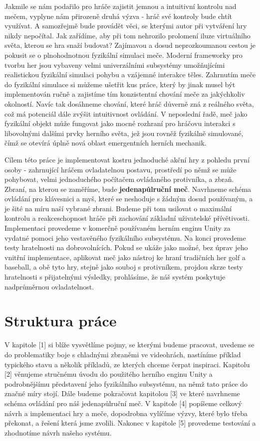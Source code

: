 Jakmile se nám podařilo pro hráče zajistit jemnou a intuitivní kontrolu nad mečem, vyplyne nám přirozeně druhá výzva - hráč své kontroly bude chtít využívat. A samozřejmě bude provádět věci, se kterými autor při vytváření hry nikdy nepočítal. Jak zařídíme, aby při tom nehrozilo prolomení iluze virtuálního světa, kterou se hra snaží budovat? Zajímavou a dosud neprozkoumanou cestou je pokusit se o plnohodnotnou fyzikální simulaci meče. Moderní frameworky pro tvorbu her jsou vybaveny velmi univerzálními subsystémy umožňujícími realistickou fyzikální simulaci pohybu a vzájemné interakce těles. Zahrnutím meče do fyzikální simulace si můžeme ušetřit kus práce, který by jinak musel být implementován ručně a zajistíme tím konzistentní chování meče za jakýchkoliv okolností. Navíc tak dosáhneme chování, které hráč důverně zná z reálného světa, což má potenciál dále zvýšit intuitivnost ovládání. V neposlední řadě, meč jako fyzikální objekt může fungovat jako mocné rozhraní pro hráčovu interakci s libovolnými dalšími prvky herního světa, jež jsou rovněž fyzikálně simulované, čímž se otevírá úplně nová oblast emergentních herních mechanik. 

Cílem této práce je implementovat kostru jednoduché akční hry z pohledu první osoby - zahrnující hráčem ovladatelnou postavu, prostředí po němž se může pohybovat, velmi jednoduchého počítačem ovládaného protivníka, a zbraň. Zbraní, na kterou se zaměříme, bude \textbf{jedenapůlruční meč}. Navrhneme schéma ovládání pro klávesnici a myš, které se neshoduje s žádným dosud používaným, a je šité na míru naší vybrané zbrani. Budeme při tom usilovat o maximální kontrolu a reakceschopnost hráče při zachování základní uživatelské přívětivosti. Implementaci provedeme v komerčně používaném herním enginu Unity za vydatné pomoci jeho vestavěného fyzikálního subsystému. Na konci provedeme testy hratelnosti na dobrovolnících. Pokud se ukáže jako možné, bez úprav jeho vnitřní implementace, aplikovat meč jako nástroj ke hraní tradičních her golf a baseball, a obě tyto hry, stejně jako souboj s protivníkem, projdou skrze testy hratelnosti s přijatelnými výsledky, prohlásíme, že náš systém poskytuje nadprůměrnou ovladatelnost.

\section*{Struktura práce}

V kapitole [1] si blíže vysvětlíme pojmy, se kterými budeme pracovat, uvedeme se do problematiky boje s chladnými zbraněmi ve videohrách, nastíníme příklad typického stavu a několik příkladů, ze kterých chceme čerpat inspiraci. Kapitolu [2] věnujeme stručnému úvodu do použitého herního enginu Unity a podrobnějšímu představení jeho fyzikálního subsystému, na němž tato práce do značné míry stojí. Dále budeme pokračovat kapitolou [3] ve které navrhneme schéma ovládání pro náš jedenapůlruční meč. V kapitole [4] popíšeme celkový návrh a implementaci hry a meče, dopodrobna vylíčíme výzvy, které bylo třeba překonat, a řešení která jsme zvolili. Nakonec v kapitole [5] provedeme testování a zhodnotíme návrh našeho systému.